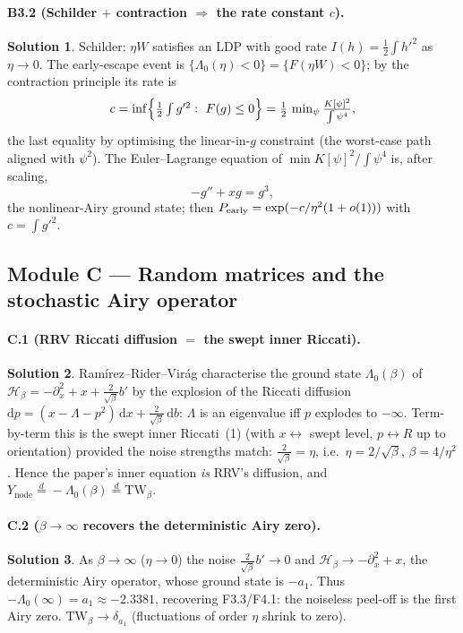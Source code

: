 \documentclass[11pt]{article}
\newcommand{\eqd}{\stackrel{d}{=}}
\newcommand{\TW}{\mathrm{TW}}
\newcommand{\dd}{\mathrm{d}}
\newcommand{\Ynode}{Y_{\mathrm{node}}}
\newcommand{\Lam}{\Lambda_0}
\theoremstyle{definition}
\newtheorem*{sol}{Solution}
\begin{document}
\paragraph{B3.2 (Schilder $+$ contraction $\Rightarrow$ the rate constant $c$).}
\begin{sol}
Schilder: $\eta W$ satisfies an LDP with good rate $I(h)=\tfrac12\int h'^2$ as $\eta\to0$. The
early-escape event is $\{\Lam(\eta)<0\}=\{F(\eta W)<0\}$; by the contraction principle its rate is
\[
c=\inf\Bigl\{\tfrac12\textstyle\int g'^2:\ F(g)\le0\Bigr\}
=\tfrac12\,\min_{\psi}\frac{K[\psi]^2}{\int\psi^4},
\]
the last equality by optimising the linear-in-$g$ constraint (the worst-case path aligned with
$\psi^2$). The Euler--Lagrange equation of $\min K[\psi]^2/\int\psi^4$ is, after scaling,
\[
-g''+x g=g^3,
\]
the nonlinear-Airy ground state; then $P_{\rm early}=\exp(-c/\eta^2(1+o(1)))$ with $c=\int g'^2$.
\end{sol}

\subsection*{Module C --- Random matrices and the stochastic Airy operator}

\paragraph{C.1 (RRV Riccati diffusion $=$ the swept inner Riccati).}
\begin{sol}
Ram\'irez--Rider--Vir\'ag characterise the ground state $\Lam(\beta)$ of
$\mathcal H_\beta=-\partial_x^2+x+\tfrac{2}{\sqrt\beta}b'$ by the explosion of the Riccati
diffusion $\dd p=(x-\Lambda-p^2)\,\dd x+\tfrac{2}{\sqrt\beta}\,\dd b$: $\Lambda$ is an eigenvalue
iff $p$ explodes to $-\infty$. Term-by-term this is the swept inner Riccati~(1) (with $x\leftrightarrow$
swept level, $p\leftrightarrow R$ up to orientation) provided the noise strengths match:
$\tfrac{2}{\sqrt\beta}=\eta$, i.e.\ $\eta=2/\sqrt\beta$, $\beta=4/\eta^2$. Hence the paper's inner
equation \emph{is} RRV's diffusion, and $\Ynode\eqd-\Lam(\beta)\eqd\TW_\beta$.
\end{sol}

\paragraph{C.2 ($\beta\to\infty$ recovers the deterministic Airy zero).}
\begin{sol}
As $\beta\to\infty$ ($\eta\to0$) the noise $\tfrac2{\sqrt\beta}b'\to0$ and $\mathcal H_\beta\to
-\partial_x^2+x$, the deterministic Airy operator, whose ground state is $-a_1$. Thus
$-\Lam(\infty)=a_1\approx-2.3381$, recovering F3.3/F4.1: the noiseless peel-off is the first Airy
zero. $\TW_\beta\to\delta_{a_1}$ (fluctuations of order $\eta$ shrink to zero).
\end{sol}
\end{document}

